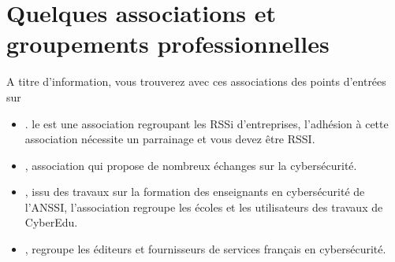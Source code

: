 \section{Quelques associations et groupements professionnelles} 

A titre d'information, vous trouverez avec ces associations des points d'entrées sur 

\begin{itemize}
  \item {}.
le  est une association regroupant les RSSi d'entreprises, l'adhésion à cette association nécessite un parrainage et vous devez être RSSI.

  \item{}
, association qui propose de nombreux échanges sur la cybersécurité.

  \item{}
, issu des travaux sur la formation des enseignants en cybersécurité de l'ANSSI, l'association regroupe les écoles et les utilisateurs des travaux de CyberEdu.

  \item{}
, regroupe les éditeurs et fournisseurs de services français en cybersécurité.
\end{itemize}

